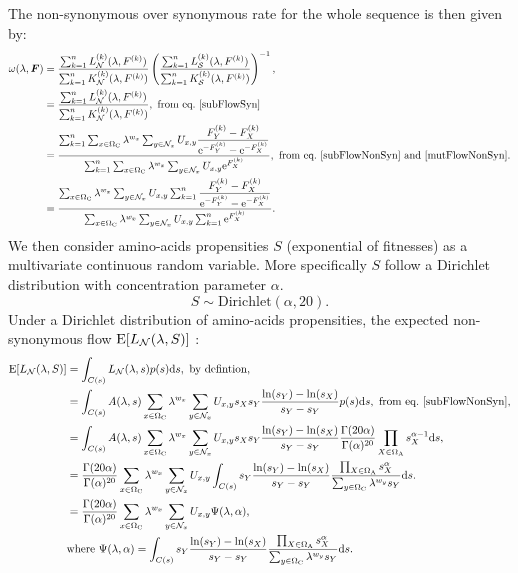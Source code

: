 The non-synonymous over synonymous rate for the whole sequence is then given by:
\begin{align}
\omega(\lambda, \bm{F})
& =\dfrac{\sum_{k=1}^{n} L_{\NonSyn}^{(k)}(\lambda, F^{(k)})}{\sum_{k=1}^{n}K_{\NonSyn}^{(k)}(\lambda, F^{(k)})}  \left( \dfrac{\sum_{k=1}^{n}L_{\Syn}^{(k)}(\lambda, F^{(k)})}{\sum_{k=1}^{n}K_{\Syn}^{(k)}(\lambda, F^{(k)})}  \right)^{-1}, \\
& =\dfrac{\sum_{k=1}^{n} L_{\NonSyn}^{(k)}(\lambda, F^{(k)})}{\sum_{k=1}^{n}K_{\NonSyn}^{(k)}(\lambda, F^{(k)})}, \ \textrm{from eq.}\ \ref{subFlowSyn} \\
& =\dfrac{ \sum_{k=1}^{n} \sum_{x \in \SetCodon} \lambda^{w_x} \sum_{y \in \NxNonSyn}  U_{x, y} \dfrac{F_Y^{(k)} - F_X^{(k)}}{\e^{ - F_Y^{(k)}} -  \e^{- F_X^{(k)}} } }{ \sum_{k=1}^{n} \sum_{x \in \SetCodon}  \lambda^{w_x}  \sum_{y \in \NxNonSyn} U_{x, y} \e^{F_X^{(k)}}}, \ \textrm{from eq.}\ \ref{subFlowNonSyn} \ \text{and} \ \ref{mutFlowNonSyn}. \\
& =\dfrac{ \sum_{x \in \SetCodon} \lambda^{w_x} \sum_{y \in \NxNonSyn}  U_{x, y}  \sum_{k=1}^{n} \dfrac{F_Y^{(k)} - F_X^{(k)}}{\e^{ - F_Y^{(k)}} -  \e^{- F_X^{(k)}} } }{  \sum_{x \in \SetCodon}  \lambda^{w_x}  \sum_{y \in \NxNonSyn} U_{x, y}  \sum_{k=1}^{n} \e^{F_X^{(k)}}}.
\label{omegaSeq}
\end{align}
We then consider amino-acids propensities $S$ (exponential of fitnesses) as a multivariate continuous random variable. More specifically $S$ follow a Dirichlet distribution with concentration parameter $\alpha$.
\begin{equation}
S \sim \mathrm{Dirichlet}(\alpha, 20).
\end{equation}
Under a Dirichlet distribution of amino-acids propensities, the expected \gls{non-synonymous} flow $\operatorname{E} [L_{\mathcal{N}}(\lambda, S)]$ :
\begin{align}
\operatorname{E} [L_{\mathcal{N}}(\lambda, S)]
& =\int_{C(s)} L_{\mathcal{N}}(\lambda, s) p(s) \mathrm{d} s, \ \textrm{by defintion}, \\
& =\int_{C(s)} A(\lambda, s) \sum_{x \in \Omega_{\mathrm{C}}} \lambda^{w_x} \sum_{y \in \mathcal{N}_x} U_{x, y} s_X s_Y\dfrac{\ln(s_Y)-\ln(s_X)}{s_Y - s_Y} p(s) \mathrm{d} s , \ \textrm{from eq.}\ \ref{subFlowNonSyn}, \\
& =\int_{C(s)} A(\lambda, s) \sum_{x \in \Omega_{\mathrm{C}}} \lambda^{w_x} \sum_{y \in \mathcal{N}_x} U_{x, y} s_X s_Y\dfrac{\ln(s_Y)-\ln(s_X)}{s_Y - s_Y} {\frac {\Gamma (20 \alpha)}{\Gamma (\alpha )^{20}}} \prod_{X \in \Omega_{\mathrm{A}}} s_X^{\alpha-1} \mathrm{d} s,\\
& ={\frac {\Gamma (20 \alpha)}{\Gamma (\alpha )^{20}}} \sum_{x \in \Omega_{\mathrm{C}}} \lambda^{w_x} \sum_{y \in \mathcal{N}_x} U_{x, y} \int_{C(s)} s_Y\dfrac{\ln(s_Y)-\ln(s_X)}{s_Y - s_Y} \dfrac{\prod_{X \in \Omega_{\mathrm{A}}} s_X^{\alpha}}{\sum_{y \in \Omega_{\mathrm{C}}} \lambda^{w_y} s_Y} \mathrm{d} s.\\
& ={\frac {\Gamma (20 \alpha)}{\Gamma (\alpha )^{20}}} \sum_{x \in \Omega_{\mathrm{C}}} \lambda^{w_x} \sum_{y \in \mathcal{N}_x} U_{x, y} \Psi(\lambda, \alpha), \\
& \textrm{where} \ \Psi(\lambda, \alpha) = \int_{C(s)} s_Y\dfrac{\ln(s_Y)-\ln(s_X)}{s_Y - s_Y} \dfrac{\prod_{X \in \Omega_{\mathrm{A}}} s_X^{\alpha}}{\sum_{y \in \Omega_{\mathrm{C}}} \lambda^{w_y} s_Y} \mathrm{d} s.
\end{align}
